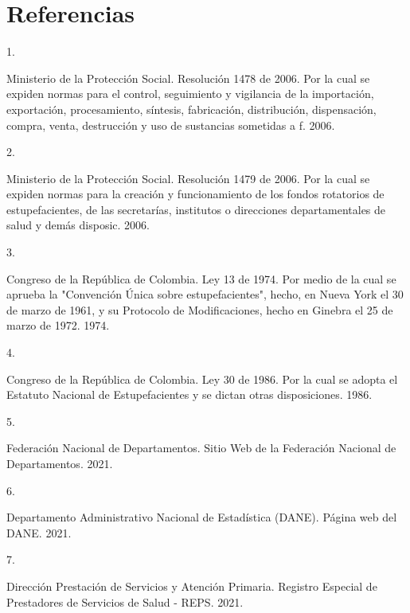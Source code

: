 \documentclass[
  oneside]{book}
\newlength{\cslhangindent}
\newlength{\csllabelwidth}
\newlength{\cslentryspacingunit} %
\newenvironment{CSLReferences}[2] %
 {%
  \setlength{\parindent}{0pt}
  \ifodd #1
  \let\oldpar\par
  \def\par{\hangindent=\cslhangindent\oldpar}
  \fi
  \setlength{\parskip}{#2\cslentryspacingunit}
 }%
 {}
\newcommand{\CSLLeftMargin}[1]{\parbox[t]{\csllabelwidth}{#1}}
\newcommand{\CSLRightInline}[1]{\parbox[t]{\linewidth - \csllabelwidth}{#1}\break}
\begin{document}
\hypertarget{referencias}{%
\chapter*{Referencias}\label{referencias}}

\hypertarget{refs}{}
\begin{CSLReferences}{0}{0}
\leavevmode{}%
\CSLLeftMargin{1. }
\CSLRightInline{Ministerio de la Protección Social. {Resoluci{ó}n 1478 de 2006. Por la cual se expiden normas para el control, seguimiento y vigilancia de la importaci{ó}n, exportaci{ó}n, procesamiento, s{í}ntesis, fabricaci{ó}n, distribuci{ó}n, dispensaci{ó}n, compra, venta, destrucci{ó}n y uso de sustancias sometidas a f}. 2006.}

\leavevmode{}%
\CSLLeftMargin{2. }
\CSLRightInline{Ministerio de la Protección Social. {Resoluci{ó}n 1479 de 2006. Por la cual se expiden normas para la creaci{ó}n y funcionamiento de los fondos rotatorios de estupefacientes, de las secretar{í}as, institutos o direcciones departamentales de salud y dem{á}s disposic}. 2006.}

\leavevmode{}%
\CSLLeftMargin{3. }
\CSLRightInline{Congreso de la República de Colombia. {Ley 13 de 1974. Por medio de la cual se aprueba la "Convenci{ó}n {Ú}nica sobre estupefacientes", hecho, en Nueva York el 30 de marzo de 1961, y su Protocolo de Modificaciones, hecho en Ginebra el 25 de marzo de 1972}. 1974.}

\leavevmode{}%
\CSLLeftMargin{4. }
\CSLRightInline{Congreso de la República de Colombia. {Ley 30 de 1986. Por la cual se adopta el Estatuto Nacional de Estupefacientes y se dictan otras disposiciones.} 1986.}

\leavevmode{}%
\CSLLeftMargin{5. }
\CSLRightInline{Federación Nacional de Departamentos. {Sitio Web de la Federaci{ó}n Nacional de Departamentos}. 2021.}

\leavevmode{}%
\CSLLeftMargin{6. }
\CSLRightInline{Departamento Administrativo Nacional de Estadística (DANE). {P{á}gina web del DANE}. 2021.}

\leavevmode{}%
\CSLLeftMargin{7. }
\CSLRightInline{Dirección Prestación de Servicios y Atención Primaria. {Registro Especial de Prestadores de Servicios de Salud - REPS.} 2021.}


\end{CSLReferences}
\end{document}

